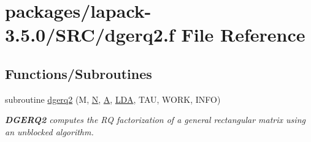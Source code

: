 \hypertarget{dgerq2_8f}{}\section{packages/lapack-\/3.5.0/\+S\+R\+C/dgerq2.f File Reference}
\label{dgerq2_8f}
\subsection*{Functions/\+Subroutines}
\begin{DoxyCompactItemize}
\item 
subroutine \hyperlink{group__doubleGEcomputational_ga360f5b8b756dc7d366c3decfcdf89000}{dgerq2} (M, \hyperlink{polmisc_8c_a0240ac851181b84ac374872dc5434ee4}{N}, \hyperlink{classA}{A}, \hyperlink{example__user_8c_ae946da542ce0db94dced19b2ecefd1aa}{L\+D\+A}, T\+A\+U, W\+O\+R\+K, I\+N\+F\+O)
\begin{DoxyCompactList}\small\item\em {\bfseries D\+G\+E\+R\+Q2} computes the R\+Q factorization of a general rectangular matrix using an unblocked algorithm. \end{DoxyCompactList}\end{DoxyCompactItemize}
